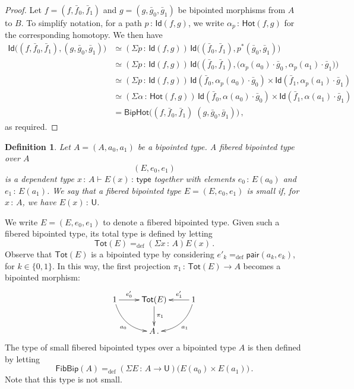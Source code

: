 \documentclass[10pt,a4paper,oneside,reqno]{amsart}
\numberwithin{equation}{section}
\theoremstyle{mythm}
\theoremstyle{mydef}
\newtheorem{definition}[theorem]{Definition}
\theoremstyle{myrmk}
\newcommand{\defeq}{=_{\mathrm{def}}}
\newcommand{\co}{\,{:}\,}
\newcommand{\type}{\mathsf{type}}
\newcommand{\ct}{\cdot}
\newcommand{\Hot}{\mathsf{Hot}}
\newcommand{\Id}{\mathsf{Id}}
\newcommand{\pair}{\mathsf{pair}}
\newcommand{\U}{\mathsf{U}}
\newcommand{\BipHot}{\mathsf{BipHot}}
\newcommand{\FibBip}{\mathsf{FibBip}}
\newcommand{\Tot}{\mathsf{Tot}}
\begin{document}
\begin{proof} Let  $f = (f, \bar{f}_0, \bar{f}_1)$ and $g = (g, \bar{g}_0, \bar{g}_1)$ be bipointed
morphisms from $A$ to $B$. To simplify notation, for a path $p \co \Id( f, g)$, we write $\alpha_p \co \Hot(f, g)$
for the corresponding homotopy. We then have
\begin{align*}
 \Id \big( (f,\bar{f}_0,\bar{f}_1) , (g,\bar{g}_0,\bar{g}_1)  \big)
  &  \simeq (\Sigma p \co \Id( f, g))  \, \Id \big(  (\bar{f}_0,\bar{f}_1),  p^{\ast} (\bar{g}_0,\bar{g}_1) \big) \\
  & \simeq
(\Sigma  p \co \Id(f ,  g)) \, \Id\big( (\bar{f}_0,\bar{f}_1),  \big(\alpha_p(a_0) \ct \bar{g}_0 \, ,  \alpha_p(a_1) \ct \bar{g}_1) \big) \\
& \simeq (\Sigma p  \co \Id(f,g))  \, \Id(\bar{f}_0, \alpha_p(a_0) \ct \bar{g}_0) \times \Id( \bar{f}_1, \alpha_p(a_1) \ct \bar{g}_1) \\
& \simeq (\Sigma \alpha \co \Hot(f, g)) \,  \Id(\bar{f}_0, \alpha(a_0) \ct \bar{g}_0) \times \Id(\bar{f}_1, \alpha(a_1) \ct \bar{g}_1) \\
& = \BipHot \big( (f,\bar{f}_0,\bar{f}_1) \; (g,\bar{g}_0,\bar{g}_1) \big) \, , 
\end{align*} 
as required.
\end{proof}





\begin{definition} \label{def:fibbipointed}
Let $A = (A, a_0, a_1)$ be a bipointed type. A \emph{fibered bipointed type over $A$}
\[
(E, e_0, e_1)
\]  
is a dependent type $x \co A \vdash E(x) \co \type$ together with elements $e_0 \co E(a_0)$ and $e_1 \co E(a_1)$.
We say that a fibered bipointed type $E = (E, e_0, e_1)$ is \emph{small} if, for
$x \co A$, we have $E(x) \co \U$.  
\end{definition}

We write $E = (E,e_0, e_1)$ to denote a fibered bipointed type. 
Given such a fibered bipointed type, its total type is defined by letting
\[
\Tot(E)  \defeq (\Sigma x \co A) E(x) \, .
\] 
Observe that $\Tot(E)$ is a bipointed type by considering $e'_k \defeq \pair(a_k, e_k)$, 
for $k \in \{ 0, 1 \}$. In this way, the first projection $\pi_1 \co \Tot(E) \to A$ becomes a bipointed morphism:
\[
\xymatrix{
1 \ar@/_1pc/[dr]_{a_0} \ar[r]^-{e'_0} & \Tot(E) \ar[d]^{\pi_1} & 1 \ar[l]_-{e'_1} \ar@/^1pc/[dl]^{a_1} \\ 
 & A \, .& }
 \]
The type of  small fibered bipointed types over a bipointed type $A$ is then defined by letting
\[
\FibBip(A) \defeq (\Sigma E \co A \to \U) \big( E(a_0) \times E(a_1) \big) \, .
 \]
 Note that this type is not small. 
\end{document}
